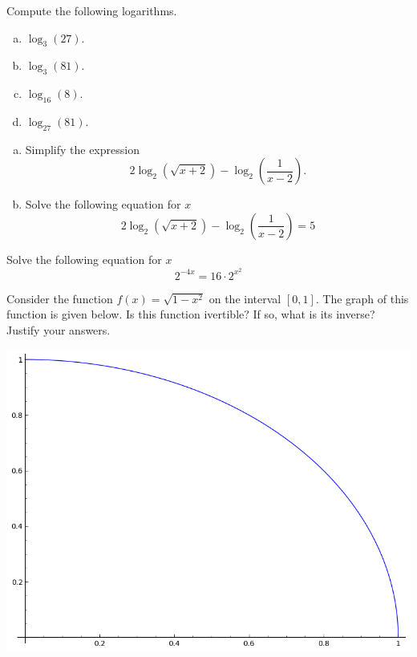 \documentclass[12pt]{amsart}
\begin{document}
\newpage

\begin{thm}\label{ex10}
  Compute the following logarithms.
  \begin{enumerate}[(a)]
  \item
    $\log_{3}(27)$.
    \vspace{1.5in}
  \item
    $\log_{3}(81)$.
    \vspace{1.5in}
  \item
    $\log_{16}(8)$.
    \vspace{1.5in}
  \item
    $\log_{27}(81)$.
    \vspace{1.5in}
  \end{enumerate}
\end{thm}

\newpage

\begin{thm}\label{ex9}
  \begin{enumerate}[(a)]
  \item
    Simplify the expression 
    $$2\log_2(\sqrt{x + 2}) - \log_2\left(\frac{1}{x - 2}\right).$$
    \vspace{2in}
  \item
    Solve the following equation for $x$
    $$ 2\log_2(\sqrt{x + 2}) - \log_2\left(\frac{1}{x - 2}\right) = 5 $$
    \vspace{2in}
  \end{enumerate}
\end{thm}

\begin{thm}\label{ex7}
  Solve the following equation for $x$
  $$2^{-4x} = 16 \cdot 2^{x^2}$$
\end{thm}

\newpage

\begin{thm}[Bonus]
  Consider the function $f(x) = \sqrt{1 - x^2}$ on the interval $[0,1]$.
  The graph of this function is given below.
  Is this function ivertible?  If so, what is its inverse?
  Justify your answers.
  \begin{center}\includegraphics[scale=.25]{plot.png}\end{center}
  
  \vspace{4in}
\end{thm}
\end{document}
